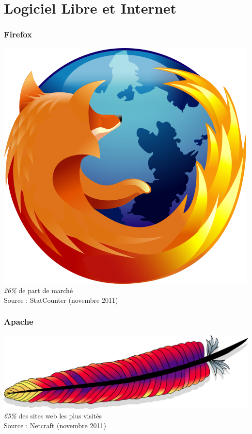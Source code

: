 \documentclass[english]{beamer}
\begin{document}
\section{Logiciel Libre et Internet}
\begin{frame}[t]
  \frametitle{Firefox}
  \begin{center}
    \includegraphics[scale=0.25]{firefox.png} \\
    \vspace{10px}
    {\LARGE \emph{26\%} de part de marché} \\
    Source : StatCounter (novembre 2011)
  \end{center}
\end{frame}

\begin{frame}[t]
  \frametitle{Apache}
  \begin{center}
    \includegraphics[scale=1.3]{apache.png} \\
    \vspace{10px}
    {\LARGE \emph{65\%} des sites web les plus visités} \\
    Source : Netcraft (novembre 2011)
  \end{center}
\end{frame}

\end{document}
